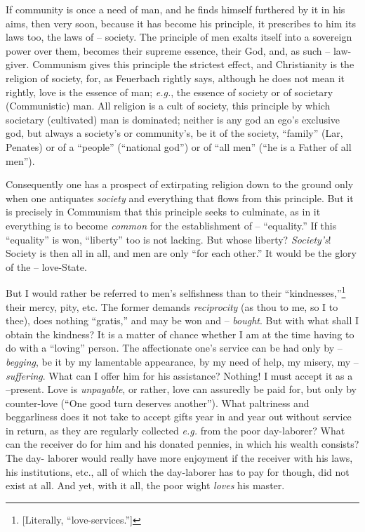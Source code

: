 If community is once a need of man, and he finds himself furthered by it in 
his aims, then very soon, because it has become his principle, it prescribes 
to him its laws too, the laws of -- society. The principle of men exalts 
itself into a sovereign power over them, becomes their supreme essence, their 
God, and, as such -- law-giver. Communism gives this principle the strictest 
effect, and Christianity is the religion of society, for, as Feuerbach rightly 
says, although he does not mean it rightly, love is the essence of man; 
\textit{e.g.}, the essence of society or of societary (Communistic) man. All 
religion is a cult of society, this principle by which societary (cultivated) 
man is dominated; neither is any god an ego's exclusive god, but always a 
society's or community's, be it of the society, ``family'' (Lar, Penates) or 
of a ``people'' (``national god'') or of ``all men'' (``he is a Father 
of all men'').

Consequently one has a prospect of extirpating religion down to the ground 
only when one antiquates \textit{society} and everything that flows from this 
principle. But it is precisely in Communism that this principle seeks to 
culminate, as in it everything is to become \textit{common} for the 
establishment of -- ``equality.'' If this ``equality'' is won, 
``liberty'' too is not lacking. But whose liberty? \textit{Society's}! 
Society is then all in all, and men are only ``for each other.'' It would be 
the glory of the -- love-State.

But I would rather be referred to men's selfishness than to their 
``kindnesses,''\footnote{[Literally, ``love-services.'']} their mercy, 
pity, etc. The former demands \textit{reciprocity} (as thou to me, so I to 
thee), does nothing ``gratis,'' and may be won and -- \textit{bought}. But 
with what shall I obtain the kindness? It is a matter of chance whether I am 
at the time having to do with a ``loving'' person. The affectionate one's 
service can be had only by -- \textit{begging}, be it by my lamentable 
appearance, by my need of help, my misery, my -- \textit{suffering}. What can 
I offer him for his assistance? Nothing! I must accept it as a --present. Love 
is \textit{unpayable}, or rather, love can assuredly be paid for, but only by 
counter-love (``One good turn deserves another''). What paltriness and 
beggarliness does it not take to accept gifts year in and year out without 
service in return, as they are regularly collected \textit{e.g.} from the 
poor day-laborer? What can the receiver do for him and his donated pennies, in 
which his wealth consists? The day- laborer would really have more enjoyment 
if the receiver with his laws, his institutions, etc., all of which the 
day-laborer has to pay for though, did not exist at all. And yet, with it all, 
the poor wight \textit{loves} his master.

